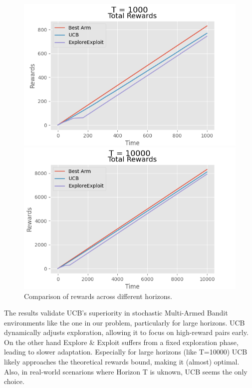 \documentclass{article}
\begin{document}
\begin{figure}[h!]
    \centering
    \begin{minipage}{0.45\textwidth}
        \centering
        \includegraphics[width=\textwidth]{./Images/plot2.png}
    \end{minipage}\hfill
    \begin{minipage}{0.45\textwidth}
        \centering
        \includegraphics[width=\textwidth]{./Images/plot3.png}
    \end{minipage}
    \caption{Comparison of rewards across different horizons.}
    \label{fig:algorithms_comparison}
\end{figure}

\noindent The results validate UCB’s superiority 
in stochastic Multi-Armed Bandit environments like the one in our problem, 
particularly for large horizons. UCB 
dynamically adjusts exploration, allowing it to focus on high-reward pairs early.
On the other hand Explore \& Exploit 
suffers from a fixed exploration phase, leading to slower adaptation.
Especially for large horizons (like T=10000) UCB likely approaches the theoretical rewards bound,
making it (almost) optimal.
Also, in real-world scenarions where Horizon T is uknown, UCB seems the only choice.
\end{document}
